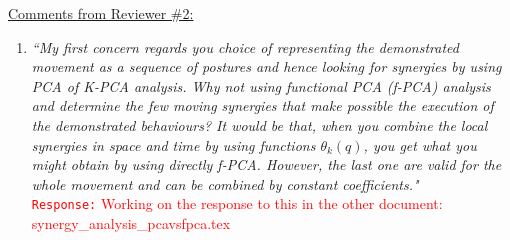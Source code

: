 \documentclass[10pt,stdletter,dateno]{newlfm}
\begin{document}
\begin{newlfm}
\underline{Comments from Reviewer \#2:}
\begin{enumerate}
\item \textit{``My first concern regards you choice of representing the demonstrated
movement as a sequence of postures and hence looking for synergies by
using PCA of K-PCA analysis. Why not using functional PCA (f-PCA)
analysis and determine the few moving synergies that make possible the
execution of the demonstrated behaviours? It would be that, when you
combine the local synergies in space and time by using functions
$\theta_k(q)$, you get what you might obtain by using directly f-PCA.
However, the last one are valid for the whole movement and can be
combined by constant coefficients."}\\
\textcolor{red}{\texttt{Response:} \small Working on the response to this in the other document: synergy\_analysis\_pcavsfpca.tex}\\


\end{enumerate}
\end{newlfm}
\end{document}
